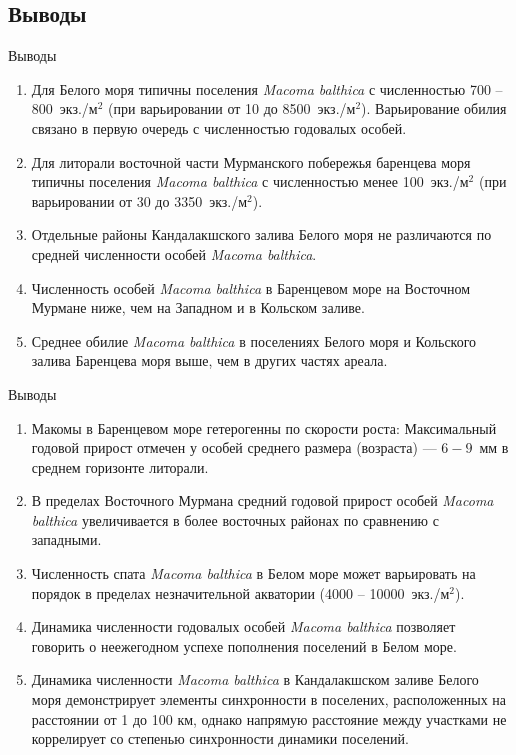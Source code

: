 \documentclass{beamer}
\begin{document}
\begin{small}
		\section{Выводы}
\begin{frame}{Выводы}
	\begin{enumerate}
		\item Для Белого моря типичны поселения {\it Macoma balthica} с численностью  700 -- 800~экз./м$^2$ (при варьировании от 10 до 8500~экз./м$^2$). Варьирование обилия связано в первую очередь с численностью годовалых особей.
		\item Для литорали восточной части Мурманского побережья баренцева моря типичны поселения {\it Macoma balthica} с численностью  менее 100~экз./м$^2$ (при варьировании от 30 до 3350~экз./м$^2$).
		\item Отдельные районы Кандалакшского залива Белого моря не различаются по средней численности особей {\it Macoma balthica}.
		\item Численность особей {\it Macoma balthica} в Баренцевом море на Восточном Мурмане ниже, чем на Западном и в Кольском заливе.
		\item Среднее обилие {\it Macoma balthica} в поселениях Белого моря и Кольского залива Баренцева моря выше, чем в других частях ареала. 
	\end{enumerate}
\end{frame}

\begin{frame}{Выводы}
	\begin{enumerate}
\addtocounter{enumi}{5}
		\item Макомы в Баренцевом море гетерогенны по скорости роста: Максимальный годовой прирост отмечен у особей среднего размера (возраста) --- $6 - 9$~мм в среднем горизонте литорали.
		\item В пределах Восточного Мурмана средний годовой прирост особей {\it Macoma balthica} увеличивается в более восточных районах по сравнению с западными.
		\item Численность спата {\it Macoma balthica} в Белом море может варьировать на порядок в пределах незначительной акватории (4000 -- 10000~экз./м$^2$).
		\item Динамика численности годовалых особей {\it Macoma balthica} позволяет говорить о неежегодном успехе пополнения поселений в Белом море.
		\item Динамика численности {\it Macoma balthica} в Кандалакшском заливе Белого моря демонстрирует элементы синхронности в поселених, расположенных на расстоянии от 1 до 100 км, однако напрямую расстояние между участками не коррелирует со степенью синхронности динамики поселений.
	\end{enumerate}
\end{frame}
		

\end{small}
\end{document}
